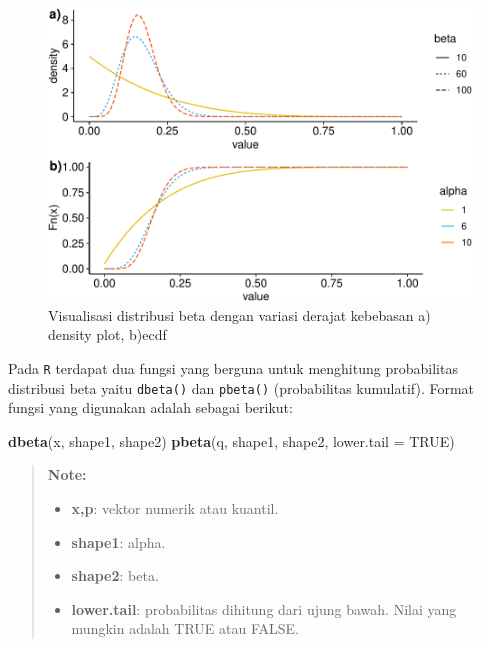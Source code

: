 \documentclass[]{book}
\newenvironment{Shaded}{\begin{snugshade}}{\end{snugshade}}
\newcommand{\KeywordTok}[1]{\textcolor[rgb]{0.13,0.29,0.53}{\textbf{#1}}}
\newcommand{\DataTypeTok}[1]{\textcolor[rgb]{0.13,0.29,0.53}{#1}}
\newcommand{\OtherTok}[1]{\textcolor[rgb]{0.56,0.35,0.01}{#1}}
\newcommand{\NormalTok}[1]{#1}
\providecommand{\tightlist}{%
  \setlength{\itemsep}{0pt}\setlength{\parskip}{0pt}}
\begin{document}
\begin{figure}

{\centering \includegraphics[width=0.9\linewidth]{EnvStat_files/figure-latex/dbeta-1} 

}

\caption{Visualisasi distribusi beta dengan variasi derajat kebebasan a) density plot, b)ecdf}\label{fig:dbeta}
\end{figure}

Pada \texttt{R} terdapat dua fungsi yang berguna untuk menghitung
probabilitas distribusi beta yaitu \texttt{dbeta()} dan \texttt{pbeta()}
(probabilitas kumulatif). Format fungsi yang digunakan adalah sebagai
berikut:

\begin{Shaded}
\begin{Highlighting}[]
\KeywordTok{dbeta}\NormalTok{(x, shape1, shape2)}
\KeywordTok{pbeta}\NormalTok{(q, shape1, shape2, }\DataTypeTok{lower.tail =} \OtherTok{TRUE}\NormalTok{)}
\end{Highlighting}
\end{Shaded}

\begin{quote}
\textbf{Note: }

\begin{itemize}
\tightlist
\item
  \textbf{x,p}: vektor numerik atau kuantil.
\item
  \textbf{shape1}: alpha.
\item
  \textbf{shape2}: beta.
\item
  \textbf{lower.tail}: probabilitas dihitung dari ujung bawah. Nilai
  yang mungkin adalah TRUE atau FALSE.
\end{itemize}
\end{quote}
\end{document}
